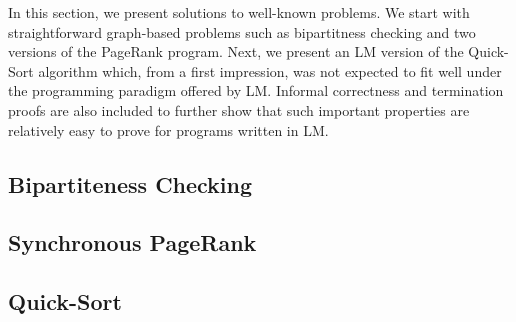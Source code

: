 In this section, we present solutions to well-known problems. We start with
straightforward graph-based problems such as bipartitness checking and two
versions of the PageRank program. Next, we present an LM version of the
Quick-Sort algorithm which, from a first impression, was not expected to fit
well under the programming paradigm offered by LM. Informal correctness and
termination proofs are also included to further show that such important
properties are relatively easy to prove for programs written in LM.

\subsection{Bipartiteness Checking}

\subsection{Synchronous PageRank}\label{section:language:pagerank}

\subsection{Quick-Sort}

